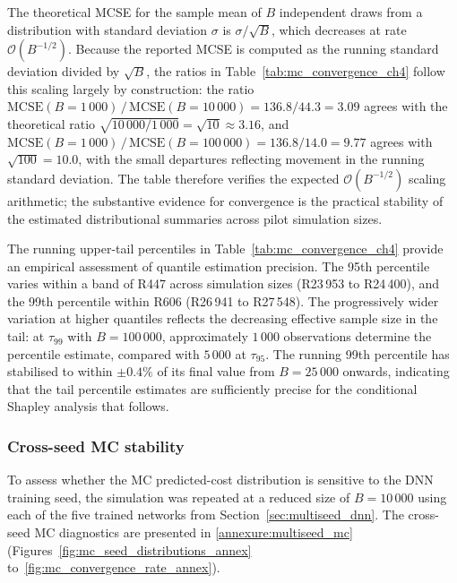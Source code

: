 The theoretical MCSE for the sample mean of $B$ independent draws
from a distribution with standard deviation $\sigma$ is
$\sigma / \sqrt{B}$, which decreases at rate
$\mathcal{O}(B^{-1/2})$.  Because the reported MCSE is computed
as the running standard deviation divided by $\sqrt{B}$, the ratios in
Table~\ref{tab:mc_convergence_ch4} follow this scaling largely by
construction: the ratio
$\mathrm{MCSE}(B{=}1\,000) \,/\, \mathrm{MCSE}(B{=}10\,000)
= 136.8 / 44.3 = 3.09$ agrees with the theoretical ratio
$\sqrt{10\,000 / 1\,000} = \sqrt{10} \approx 3.16$, and
$\mathrm{MCSE}(B{=}1\,000) \,/\, \mathrm{MCSE}(B{=}100\,000)
= 136.8 / 14.0 = 9.77$ agrees with $\sqrt{100} = 10.0$, with the small
departures reflecting movement in the running standard deviation.  The
table therefore verifies the expected $\mathcal{O}(B^{-1/2})$ scaling
arithmetic; the substantive evidence for convergence is the practical
stability of the estimated distributional summaries across pilot
simulation sizes.

The running upper-tail percentiles in
Table~\ref{tab:mc_convergence_ch4} provide an empirical assessment of
quantile estimation precision.  The 95th percentile varies within a band
of R447 across simulation sizes (R23\,953 to R24\,400), and the 99th
percentile within R606 (R26\,941 to R27\,548).  The progressively wider
variation at higher quantiles reflects the decreasing effective sample
size in the tail: at $\tau_{99}$ with $B = 100\,000$, approximately
$1\,000$ observations determine the percentile estimate, compared with
$5\,000$ at $\tau_{95}$.  The running 99th percentile has stabilised to
within $\pm 0.4\%$ of its final value from $B = 25\,000$ onwards,
indicating that the tail percentile estimates are sufficiently precise
for the conditional Shapley analysis that follows.

\subsubsection{Cross-seed MC stability}
\label{sec:cross_seed_mc_ch4}

To assess whether the MC predicted-cost distribution is
sensitive to the DNN training seed, the simulation was repeated
at a reduced size of $B = 10\,000$ using each of the five trained
networks from Section~\ref{sec:multiseed_dnn}.  The cross-seed MC
diagnostics are presented in
\ref{annexure:multiseed_mc}
(Figures~\ref{fig:mc_seed_distributions_annex}
to~\ref{fig:mc_convergence_rate_annex}).

